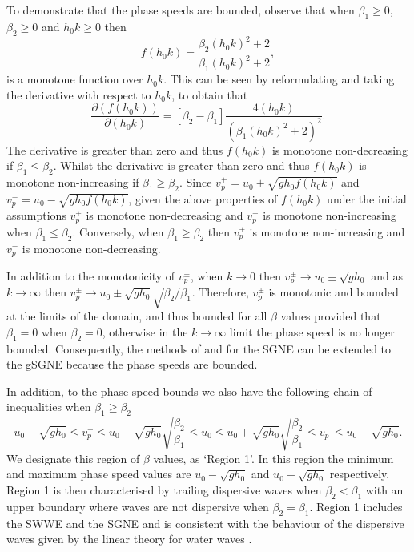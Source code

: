 \documentclass[10pt]{elsarticle}
\begin{document}
To demonstrate that the phase speeds are bounded, observe that when $\beta_1 \ge 0$, $\beta_2 \ge 0$ and $h_0 k \ge 0$ then
\begin{equation*}
f(h_0k) = \dfrac{\beta_2 \left(h_0 k\right)^2 + 2}{\beta_1 \left(h_0 k\right)^2 + 2},
\end{equation*}
is a monotone function over $h_0 k$. This can be seen by reformulating and taking the derivative with respect to $h_0 k$, to obtain that 
\begin{equation*}
 \dfrac{\partial \left(f(h_0k)\right)}{\partial \left(h_0 k\right)} = \left[\beta_2 - \beta_1\right] \dfrac{4\left(h_0 k\right)}{\left( \beta_1 \left(h_0 k\right)^2 + 2\right)^2}.
\end{equation*}
The derivative is greater than zero and thus $f(h_0k)$ is monotone non-decreasing if $\beta_1 \le \beta_2$. Whilst the derivative is greater than zero and thus $f(h_0k)$ is monotone non-increasing if $\beta_1 \ge  \beta_2$. Since $v^+_p = u_0 + \sqrt{gh_0 f(h_0 k)} $ and $v^-_p = u_0 - \sqrt{gh_0 f(h_0 k)}$, given the above properties of $f(h_0k)$ under the initial assumptions $v^+_p$ is monotone non-decreasing and $v^-_p$ is monotone non-increasing when $\beta_1 \le  \beta_2$. Conversely, when $\beta_1 \ge  \beta_2$ then $v^+_p$ is monotone non-increasing and $v^-_p$ is monotone non-decreasing. 

In addition to the monotonicity of $v^\pm_p$, when $k \rightarrow 0$ then $v^\pm_p \rightarrow u_0 \pm \sqrt{gh_0}$ and as $k \rightarrow \infty$ then $v^\pm_p \rightarrow u_0 \pm \sqrt{gh_0} \sqrt{{\beta_2}/ \beta_1 }$. Therefore, $v^\pm_p$ is monotonic and bounded at the limits of the domain, and thus bounded for all $\beta$ values provided that $\beta_1 = 0$ when $\beta_2 = 0$, otherwise in the $k \rightarrow \infty$ limit the phase speed is no longer bounded. Consequently, the methods of \citet{Hank-etal-2010-2034} and \citet{Zoppou-etal-2017} for the SGNE can be extended to the gSGNE because the phase speeds are bounded.

In addition, to the phase speed bounds we also have the following chain of inequalities when ${\beta_1} \ge \beta_2$ 
\begin{equation}
u_0 -  \sqrt{gh_0} \le  v^-_p \le u_0 - \sqrt{gh_0} \sqrt{\dfrac{\beta_2}{ \beta_1}} \le u_0 \le u_0 + \sqrt{gh_0} \sqrt{\dfrac{\beta_2}{\beta_1}} \le   v^+_p  \le u_0 +   \sqrt{gh_0}.
\label{eq:wavespeedbound1}
\end{equation}
We designate this region of $\beta$ values, as `Region 1'. In this region the minimum and maximum phase speed values are $ u_0 -  \sqrt{gh_0}$ and $u_0 +  \sqrt{gh_0} $ respectively. Region 1 is then characterised by trailing dispersive waves when $\beta_2 <  \beta_1$ with an upper boundary where waves are not dispersive when $\beta_2 =  \beta_1$. Region 1 includes the SWWE and the SGNE and is consistent with the behaviour of the dispersive waves given by the linear theory for water waves \cite{Whitham-1967-399}. 
\end{document}
